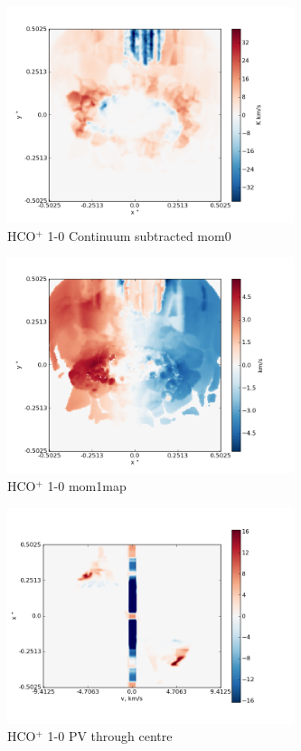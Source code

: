 \documentclass[useAMS,usenatbib]{mn2e}
\begin{document}
\begin{figure}
 \includegraphics[width=84mm]{Figures/sim/imageHCOp_1-0_30deg_contSub.png}

 \caption{HCO$^+$ 1-0 Continuum subtracted mom0}
\end{figure}

\begin{figure}
 \includegraphics[width=84mm]{Figures/sim/imageHCOp_1-0_30deg_mom1.png}

 \caption{HCO$^+$ 1-0 mom1map}
\end{figure}

\begin{figure}
 \includegraphics[width=84mm]{Figures/sim/imageHCOp_1-0_30deg_PV_centre.png}

 \caption{HCO$^+$ 1-0 PV through centre}
\end{figure}
\end{document}
